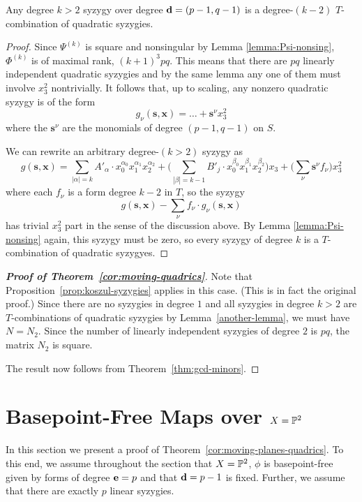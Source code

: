 \documentclass[fleqn,reqno]{amsart}
\begin{document}
\begin{lemma}
\label{another-lemma}
Any degree $k>2$ syzygy over degree $\mathbf d=(p-1,q-1)$ is
a degree-$(k-2)$ $T$-combination of quadratic syzygies.
\end{lemma}

\begin{proof}
Since $\Psi^{(k)}$ is square and nonsingular by Lemma \ref{lemma:Psi-nonsing},
$\Phi^{(k)}$ is of maximal rank, $(k+1)^3pq$.
This means that there are $pq$ linearly independent quadratic syzygies
and by the same lemma any one of them must involve $x_3^2$ nontrivially.
It follows that, up to scaling, any nonzero quadratic syzygy is of the form
\[
	g_\nu(\mathbf s,\mathbf x)=\ldots+{\mathbf{s}}^\nu x_3^2
\]
where the $\mathbf{s}^\nu$ are the monomials of degree $(p-1,q-1)$ on $S$.

We can rewrite an arbitrary degree-$(k>2)$ syzygy as
\[
	g(\mathbf s, \mathbf x)=\sum_{|\alpha|=k} A'_\alpha\cdot
	x_0^{\alpha_0}x_1^{\alpha_1}x_2^{\alpha_2}+
	\big(\sum_{|\beta|=k-1} B'_{j}\cdot
	x_0^{\beta_0}x_1^{\beta_1}x_2^{\beta_2}\big)x_3+
	\big(\sum_\nu \mathbf{s}^\nu f_\nu\big)x_3^2
\]
where each $f_\nu$ is a form degree $k-2$ in $T$, so the syzygy
\[
	g(\mathbf s, \mathbf x)-\sum_\nu f_\nu\cdot g_\nu(\mathbf s, \mathbf x)
\]
has trivial $x_3^2$ part in the sense of the discussion above.
By Lemma \ref{lemma:Psi-nonsing} again, this syzygy must be zero,
so every syzygy of degree $k$ is a $T$-combination of quadratic syzygyes.
\end{proof}

\begin{proof}[\bf Proof of Theorem~\ref{cor:moving-quadrics}]
Note that Proposition~\ref{prop:koszul-syzygies} applies in this case.
(This is in fact the original proof.)
Since there are no syzygies in degree $1$ and all syzygies in degree $k>2$ are
$T$-combinations of quadratic syzygies by Lemma~\ref{another-lemma},
we must have $N=N_2$.
Since the number of linearly independent syzygies of degree $2$ is $pq$,
the matrix $N_2$ is square.

The result now follows from Theorem~\ref{thm:gcd-minors}.
\end{proof}



\section{Basepoint-Free Maps over $X=\mathbb{P}^2$}
\label{sec:moving-planes-quadrics}

\begin{paragraf*}
In this section we present a proof of Theorem~\ref{cor:moving-planes-quadrics}.
To this end, we assume throughout the section that $X=\mathbb{P}^2$,
$\phi$ is basepoint-free given by forms of degree $\mathbf e=p$
and that $\mathbf d=p-1$ is fixed.
Further, we assume that there are exactly $p$ linear syzygies.
\end{paragraf*}
\end{document}
